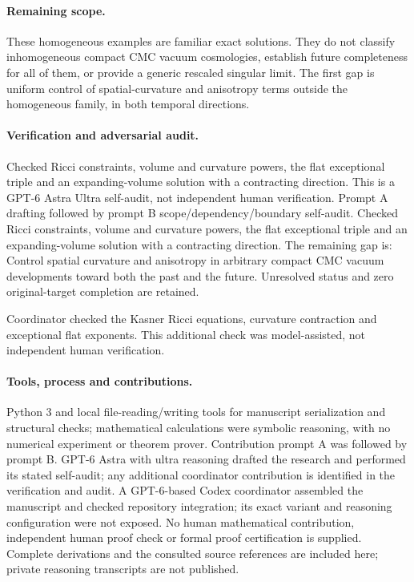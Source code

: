 \documentclass[11pt]{article}
\begin{document}
\paragraph{Remaining scope.} These homogeneous examples are familiar exact solutions. They do not classify inhomogeneous compact CMC vacuum cosmologies, establish future completeness for all of them, or provide a generic rescaled singular limit. The first gap is uniform control of spatial-curvature and anisotropy terms outside the homogeneous family, in both temporal directions.

\paragraph{Verification and adversarial audit.}
Checked Ricci constraints, volume and curvature powers, the flat exceptional triple and an expanding-volume solution with a contracting direction. This is a GPT-6 Astra Ultra self-audit, not independent human verification. Prompt A drafting followed by prompt B scope/dependency/boundary self-audit. Checked Ricci constraints, volume and curvature powers, the flat exceptional triple and an expanding-volume solution with a contracting direction. The remaining gap is: Control spatial curvature and anisotropy in arbitrary compact CMC vacuum developments toward both the past and the future. Unresolved status and zero original-target completion are retained.

Coordinator checked the Kasner Ricci equations, curvature contraction and exceptional flat exponents. This additional check was model-assisted, not independent human verification.

\paragraph{Tools, process and contributions.}
Python 3 and local file-reading/writing tools for manuscript serialization and structural checks; mathematical calculations were symbolic reasoning, with no numerical experiment or theorem prover. Contribution prompt A was followed by prompt B. GPT-6 Astra with ultra reasoning drafted the research and performed its stated self-audit; any additional coordinator contribution is identified in the verification and audit. A GPT-6-based Codex coordinator assembled the manuscript and checked repository integration; its exact variant and reasoning configuration were not exposed. No human mathematical contribution, independent human proof check or formal proof certification is supplied. Complete derivations and the consulted source references are included here; private reasoning transcripts are not published.
\end{document}
